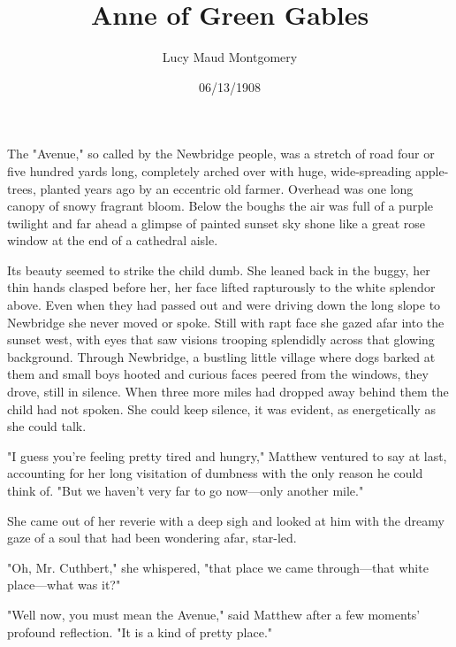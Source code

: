 \documentclass[a4paper]{article}
\title{Anne of Green Gables}
\author{Lucy Maud Montgomery}
\date{06/13/1908}
\begin{document}
\maketitle
The "Avenue," so called by the Newbridge people, was a stretch of road four or five hundred yards long, completely arched over with huge, wide-spreading apple-trees, planted years ago by an eccentric old farmer. Overhead was one long canopy of snowy fragrant bloom. Below the boughs the air was full of a purple twilight and far ahead a glimpse of painted sunset sky shone like a great rose window at the end of a cathedral aisle.



Its beauty seemed to strike the child 
dumb. She leaned back in the buggy, her thin hands clasped before her, her face lifted rapturously to the white splendor above. Even when they had passed out and were driving down the long slope to Newbridge she never moved or spoke. Still with rapt face she gazed afar into the sunset west, with eyes that saw visions trooping splendidly across that glowing background. Through Newbridge, a bustling little village where dogs barked at them and small boys hooted and curious faces peered from the windows, they drove, still in silence. When three more miles had dropped away behind them the child had not spoken. She could keep silence, it was evident, as energetically as she could talk.

                                   "I guess you're feeling pretty tired and hungry," Matthew ventured to say at last, accounting for her long visitation of dumbness with the only reason he could think of. "But we haven't very far to go now---only another mile."

She came out of her reverie                            with a deep sigh and looked at him with the dreamy gaze of a soul that had been                     wondering afar, star-led.

"Oh, Mr. Cuthbert," she whispered, 
"that place we came through---that white place---what was it?"

"Well now, you must mean the Avenue," said Matthew after a few moments' profound reflection. "It is a kind of pretty place."
\end{document}
